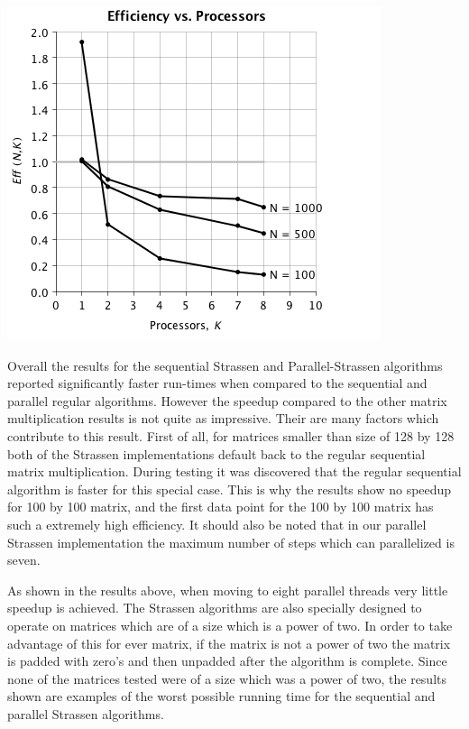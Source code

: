 \documentclass{dependencies/acm_proc_article-sp}
\begin{document}
\begin{center}
\includegraphics[scale=0.5]{images/parallel-stras/eff-vs-proc.png}
\end{center}
Overall the results for the sequential Strassen and Parallel-Strassen
algorithms reported significantly faster run-times when compared to the
sequential and parallel regular algorithms. However the speedup
compared to the other matrix multiplication results is not quite as
impressive. Their are many factors which contribute to this result.
First of all, for matrices smaller than size of 128 by 128 both of the
Strassen implementations default back to the regular sequential matrix
multiplication. During testing it was discovered that the regular sequential
algorithm is faster for this special case. This is why the results show no
speedup for 100 by 100 matrix, and the first data point for the  100 by 100
matrix has such a extremely high efficiency. It should also be noted that in 
our parallel Strassen implementation the maximum number of steps which can 
parallelized is seven. 

As shown in the results above, when moving to eight parallel threads
very little speedup is achieved. The Strassen algorithms are also specially
designed to operate on matrices which are of a size which is a power of two.
In order to take advantage of this for ever matrix, if the matrix is not a
power of two the matrix is padded with zero's and then unpadded after the
algorithm is complete. Since none of the matrices tested were of a size which
was a power of two, the results shown are examples of the worst possible
running time for the sequential and parallel Strassen algorithms. 
\end{document}
